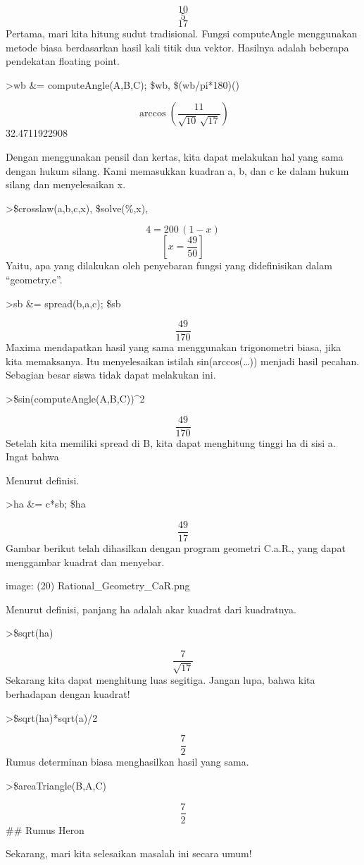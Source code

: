 \documentclass[
]{book}
\begin{document}
\[10\] \[5\] \[17\]Pertama, mari kita hitung sudut tradisional. Fungsi computeAngle menggunakan metode biasa berdasarkan hasil kali titik dua vektor. Hasilnya adalah beberapa pendekatan floating point.

\textgreater wb \&= computeAngle(A,B,C); \$wb, \$(wb/pi*180)()

\[\arccos \left(\frac{11}{\sqrt{10}\,\sqrt{17}}\right)\] 32.4711922908

Dengan menggunakan pensil dan kertas, kita dapat melakukan hal yang sama dengan hukum silang. Kami memasukkan kuadran a, b, dan c ke dalam hukum silang dan menyelesaikan x.

\textgreater\$crosslaw(a,b,c,x), \$solve(\%,x),

\[4=200\,\left(1-x\right)\] \[\left[ x=\frac{49}{50} \right]\]Yaitu, apa yang dilakukan oleh penyebaran fungsi yang didefinisikan dalam ``geometry.e''.

\textgreater sb \&= spread(b,a,c); \$sb

\[\frac{49}{170}\]Maxima mendapatkan hasil yang sama menggunakan trigonometri biasa, jika kita memaksanya. Itu menyelesaikan istilah sin(arccos(\ldots)) menjadi hasil pecahan. Sebagian besar siswa tidak dapat melakukan ini.

\textgreater\$sin(computeAngle(A,B,C))\^{}2

\[\frac{49}{170}\]Setelah kita memiliki spread di B, kita dapat menghitung tinggi ha di sisi a. Ingat bahwa

Menurut definisi.

\textgreater ha \&= c*sb; \$ha

\[\frac{49}{17}\]Gambar berikut telah dihasilkan dengan program geometri C.a.R., yang dapat menggambar kuadrat dan menyebar.

image: (20) Rational\_Geometry\_CaR.png

Menurut definisi, panjang ha adalah akar kuadrat dari kuadratnya.

\textgreater\$sqrt(ha)

\[\frac{7}{\sqrt{17}}\]Sekarang kita dapat menghitung luas segitiga. Jangan lupa, bahwa kita berhadapan dengan kuadrat!

\textgreater\$sqrt(ha)*sqrt(a)/2

\[\frac{7}{2}\]Rumus determinan biasa menghasilkan hasil yang sama.

\textgreater\$areaTriangle(B,A,C)

\[\frac{7}{2}\]\#\# Rumus Heron

Sekarang, mari kita selesaikan masalah ini secara umum!
\end{document}
